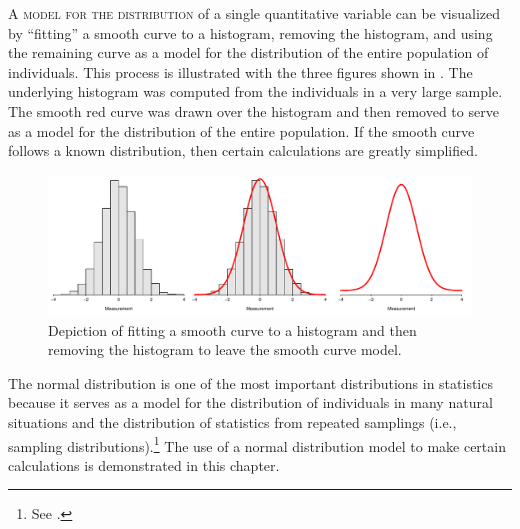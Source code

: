 \documentclass[10pt,openany]{book}\usepackage[]{graphicx}\usepackage[]{color}
\newenvironment{knitrout}{}{} %
\begin{document}
\minitoc
\newpage


\lettrine{A}{ model for the distribution} of a single quantitative variable can be visualized by ``fitting'' a smooth curve to a histogram, removing the histogram, and using the remaining curve as a model for the distribution of the entire population of individuals.  This process is illustrated with the three figures shown in .  The underlying histogram was computed from the individuals in a very large sample.  The smooth red curve was drawn over the histogram and then removed to serve as a model for the distribution of the entire population.  If the smooth curve follows a known distribution, then certain calculations are greatly simplified.

\begin{knitrout}
\color{fgcolor}\begin{figure}[hbtp]

{\centering \includegraphics[width=.95\linewidth]{Figs/NormDensityEx-1} 

}

\caption[Depiction of fitting a smooth curve to a histogram and then removing the histogram to leave the smooth curve model]{Depiction of fitting a smooth curve to a histogram and then removing the histogram to leave the smooth curve model.}\label{fig:NormDensityEx}
\end{figure}


\end{knitrout}

The normal distribution is one of the most important distributions in statistics because it serves as a model for the distribution of individuals in many natural situations and the distribution of statistics from repeated samplings (i.e., sampling distributions).\footnote{See .}  The use of a normal distribution model to make certain calculations is demonstrated in this chapter.
\end{document}
